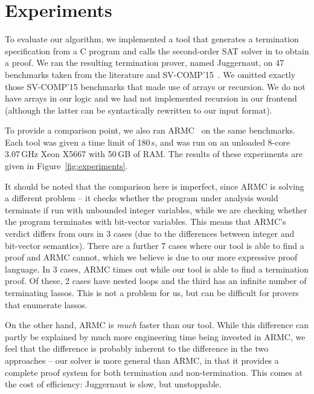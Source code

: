 \documentclass[a4paper]{llncs}
\begin{document}
\section{Experiments}

To evaluate our algorithm, we implemented a tool that generates a
termination specification from a C program and calls the second-order SAT solver in \cite{kalashnikov} to obtain a proof.
We ran the resulting termination prover,
named {\sc Juggernaut}, on 47
benchmarks taken from the literature and
SV-COMP'15~\cite{svcomp15}.
We omitted exactly those SV-COMP'15
benchmarks that made use of arrays or recursion. We do not have arrays in
our logic and we had not implemented recursion in our frontend (although the
latter can be syntactically rewritten to our input format).

To provide a comparison point, we also ran {\sc ARMC}~\cite{armc-website} on
the same benchmarks.  Each tool was given a time limit of 180\,s, and was
run on an unloaded 8-core 3.07\,GHz Xeon X5667 with 50\,GB of RAM.  The
results of these experiments are given in Figure~\ref{fig:experiments}.

It should be noted that the comparison here is imperfect, since {\sc ARMC}
is solving a different problem -- it checks whether the program
under analysis would terminate if run with unbounded integer variables,
while we are checking whether the program terminates with bit-vector
variables.  This means that {\sc ARMC}'s verdict differs from ours
in 3 cases (due to the differences between integer and bit-vector
semantics).  There are a further 7 cases where our tool is able to find a
proof and {\sc ARMC} cannot, which we believe is due to our more expressive
proof language.  In 3 cases, {\sc ARMC} times out while our tool is able to
find a termination proof.  Of these, 2 cases have nested loops and the
third has an infinite number of terminating lassos.  This is not a problem for us,
but can be difficult for provers that enumerate lassos.

On the other hand, {\sc ARMC} is \emph{much} faster than our tool.  While
this difference can partly be explained by much more engineering time being
invested in {\sc ARMC}, we feel that the difference is probably inherent to
the difference in the two approaches -- our solver is more general
than {\sc ARMC}, in that it provides a complete proof system for both
termination and non-termination.  This comes at the cost of efficiency:
{\sc Juggernaut} is slow, but unstoppable.

\end{document}
